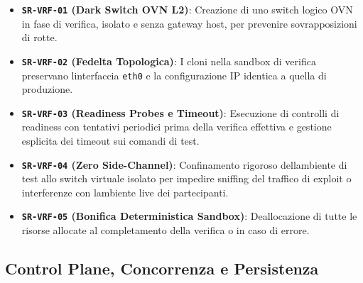 \begin{itemize}
\tightlist
\item
  \textbf{\passthrough{\lstinline!SR-VRF-01!} (Dark Switch OVN L2)}:
  Creazione di uno switch logico OVN in fase di verifica, isolato e
  senza gateway host, per prevenire sovrapposizioni di rotte.
\item
  \textbf{\passthrough{\lstinline!SR-VRF-02!} (Fedelta Topologica)}: I
  cloni nella sandbox di verifica preservano
  l\textquotesingle interfaccia \passthrough{\lstinline!eth0!} e la
  configurazione IP identica a quella di produzione.
\item
  \textbf{\passthrough{\lstinline!SR-VRF-03!} (Readiness Probes e
  Timeout)}: Esecuzione di controlli di readiness con tentativi
  periodici prima della verifica effettiva e gestione esplicita dei
  timeout sui comandi di test.
\item
  \textbf{\passthrough{\lstinline!SR-VRF-04!} (Zero Side-Channel)}:
  Confinamento rigoroso dell\textquotesingle ambiente di test allo
  switch virtuale isolato per impedire sniffing del traffico di exploit
  o interferenze con l\textquotesingle ambiente live dei partecipanti.
\item
  \textbf{\passthrough{\lstinline!SR-VRF-05!} (Bonifica Deterministica
  Sandbox)}: Deallocazione di tutte le risorse allocate al completamento
  della verifica o in caso di errore.
\end{itemize}

\subsection{Control Plane, Concorrenza e
Persistenza}\label{control-plane-concorrenza-e-persistenza}

